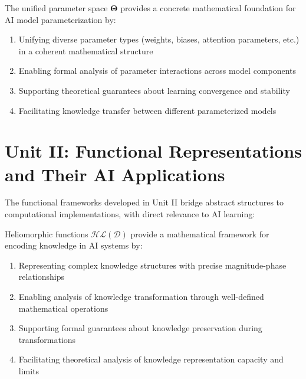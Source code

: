 \begin{theorem}
\label{thm:parameter_space_ai}
The unified parameter space $\boldsymbol{\Theta}$ provides a concrete mathematical foundation for AI model parameterization by:
\begin{enumerate}
    \item Unifying diverse parameter types (weights, biases, attention parameters, etc.) in a coherent mathematical structure
    \item Enabling formal analysis of parameter interactions across model components
    \item Supporting theoretical guarantees about learning convergence and stability
    \item Facilitating knowledge transfer between different parameterized models
\end{enumerate}
\end{theorem}

\section{Unit II: Functional Representations and Their AI Applications}

The functional frameworks developed in Unit II bridge abstract structures to computational implementations, with direct relevance to AI learning:

\begin{theorem}
\label{thm:heliomorphic_functions_ai}
Heliomorphic functions $\mathcal{HL}(\mathcal{D})$ provide a mathematical framework for encoding knowledge in AI systems by:
\begin{enumerate}
    \item Representing complex knowledge structures with precise magnitude-phase relationships
    \item Enabling analysis of knowledge transformation through well-defined mathematical operations
    \item Supporting formal guarantees about knowledge preservation during transformations
    \item Facilitating theoretical analysis of knowledge representation capacity and limits
\end{enumerate}
\end{theorem}

